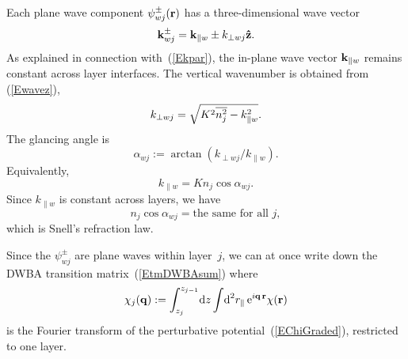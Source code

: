 Each plane wave component $\psi^\pm_{wj}(\mathbf{r})$ has
a three-dimensional wave vector
\begin{equation}\label{Ekpmwj3}
  \mathbf{k}^\pm_{wj}= \mathbf{k}_{\parallel w} \pm k_{\perp wj}\mathbf{\hat z}.
\end{equation}
%
%
As explained in connection with~(\ref{Ekpar}),
the in-plane wave vector $\mathbf{k}_{\parallel w}$ remains constant
across layer interfaces.
The vertical wavenumber is obtained from (\ref{Ewavez}),
\begin{equation}\label{Ekperpwj}
  k_{\perp wj} = \sqrt{K^2 \overline{n_j^2} - k_{\parallel w}^2}.
\end{equation}
The glancing angle is
\begin{equation}\label{Edef_alpha}
  \alpha_{wj}:=\arctan(k_{\perp wj}/k_{\parallel w}).  
\end{equation}
Equivalently,
\begin{equation}
  k_{\parallel w}=K n_j \cos\alpha_{wj}. 
\end{equation}
Since $k_{\parallel w}$ is constant across layers,
we have
\begin{equation}\label{ESnell}
  n_j \cos\alpha_{wj} = \text{the same for all }j,
\end{equation}
which is Snell's refraction law.

Since the $\psi^\pm_{wj}$ are plane waves within layer~$j$,
we can at once write down the DWBA transition matrix~(\ref{EtmDWBAsum})
%
where
\begin{equation}\label{Echij}
  \chi_j(\mathbf{q})
  := \int_{z_j}^{z_{j-1}}\!\text{d} z \int\!\text{d}^2r_\parallel\, \text{e}^{i\mathbf{q}\,\mathbf{r}}\chi(\mathbf{r})
\end{equation}
%
is the Fourier transform
of the perturbative potential~(\ref{EChiGraded}),
restricted to one layer.

